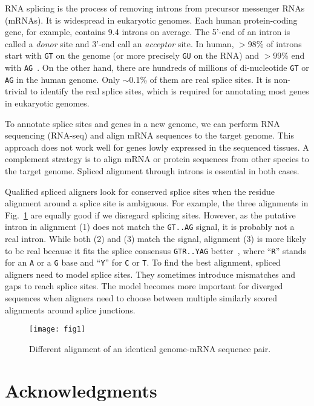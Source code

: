 \documentclass[webpdf,contemporary,large,namedate]{oup-authoring-template}%
\begin{document}
RNA splicing is the process of removing introns from precursor messenger RNAs (mRNAs).
It is widespread in eukaryotic genomes.
Each human protein-coding gene, for example, contains 9.4 introns on average.
The 5'-end of an intron is called a \emph{donor} site
and 3'-end call an \emph{acceptor} site.
In human, $>$98\% of introns start with {\tt GT} on the genome (or more precisely {\tt GU} on the RNA)
and $>$99\% end with {\tt AG}~\citep{Sibley:2016vh}.
On the other hand, there are hundreds of millions of di-nucleotide {\tt GT} or {\tt AG}
in the human genome.
Only $\sim$0.1\% of them are real splice sites.
It is non-trivial to identify the real splice sites, which is required for annotating most genes in eukaryotic genomes.

To annotate splice sites and genes in a new genome,
we can perform RNA sequencing (RNA-seq) and align mRNA sequences to the target genome.
This approach does not work well for genes lowly expressed in the sequenced tissues.
A complement strategy is to align mRNA or protein sequences from other species to the target genome.
Spliced alignment through introns is essential in both cases.

Qualified spliced aligners look for conserved splice sites
when the residue alignment around a splice site is ambiguous.
For example, the three alignments in Fig.~\ref{fig:1} are equally good if we disregard splicing sites.
However, as the putative intron in alignment (1) does not match the {\tt GT..AG}
signal, it is probably not a real intron.
While both (2) and (3) match the signal,
alignment (3) is more likely to be real because it fits the splice consensus {\tt GTR..YAG} better~\citep{Irimia:2008aa},
where ``{\tt R}'' stands for an {\tt A} or a {\tt G} base and ``{\tt Y}'' for {\tt C} or {\tt T}.
To find the best alignment, spliced aligners need to model splice sites.
They sometimes introduce mismatches and gaps to reach splice sites.
The model becomes more important for diverged sequences
when aligners need to choose between multiple similarly scored alignments around splice junctions.

\begin{figure}[b]
\centering
\texttt{[image: fig1]}
\caption{Different alignment of an identical genome-mRNA sequence pair.}\label{fig:1}
\end{figure}

\section*{Acknowledgments}
\end{document}
